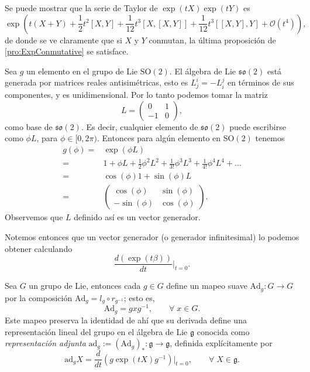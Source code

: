 Se puede mostrar que la serie de Taylor de $\exp (t X) \exp (t Y)$ es
%
\begin{equation*}
\exp \left( t (X + Y) + \frac{1}{2} t^{2} [X, Y] + \frac{1}{12} t^{3} [X, [X, Y]] + \frac{1}{12} t^{3} [[X, Y], Y] +\mathcal{O}(t^{4}) \right),
\end{equation*}
%
de donde se ve claramente que si $X$ y $Y$ conmutan, la \'{u}ltima proposici\'{o}n de \ref{pro:ExpConmutative} se satisface.

\begin{ex}
Sea $g$ un elemento en el grupo de Lie $\mathrm{SO}(2)$. El \'{a}lgebra de Lie $\mathfrak{so}(2)$ est\'{a} generada por matrices reales antisim\'{e}tricas, esto es $L^{i}_{j} = -L^{j}_{i}$ en t\'{e}rminos de sus componentes, y es unidimensional. Por lo tanto podemos tomar la matriz
%
\[L = 
 \begin{pmatrix}
  0 & 1 \\
  -1 & 0
 \end{pmatrix},
\]
%
como base de $\mathfrak{so}(2)$. Es decir, cualquier elemento de $\mathfrak{so}(2)$ puede escribirse como $\phi L$, para $\phi \in [0, 2 \pi)$. Entonces para alg\'{u}n elemento en $\mathrm{SO}(2)$  tenemos
%
\begin{align*}
g (\phi) = & \exp (\phi L) \\
= & 1 + \phi L + \frac{1}{2} \phi^{2} L^{2} + \frac{1}{3 !} \phi^{3} L^{3} + \frac{1}{4 !} \phi^{4} L^{4} + ... \\
= & \cos (\phi) 1 + \sin (\phi) L \\
= & \begin{pmatrix} \cos (\phi) & \sin (\phi) \\ -\sin (\phi) & \cos (\phi) \end{pmatrix}.
\end{align*}
%
Observemos que $L$ definido as\'{i} es un vector generador.
\end{ex}

\begin{obs}
Notemos entonces que un vector generador (o generador infinitesimal) lo podemos obtener calculando $$\frac{d (\exp (t \beta))}{dt} \bigg\vert_{t=0}.$$
\end{obs}

\begin{mydef}
Sea $G$ un grupo de Lie, entonces cada $g \in G$ define un mapeo suave $\mathrm{Ad}_{g}: G \rightarrow G$ por la composici\'{o}n $\mathrm{Ad}_{g} = l_{g} \circ r_{g^{-1}}$; esto es,
%
\begin{equation}
\mathrm{Ad}_{g} = g x g^{-1}, \qquad \forall \; x \in G.
\end{equation}
%
Este mapeo preserva la identidad de ah\'{i} que su derivada define una representaci\'{o}n lineal del grupo en el \'{a}lgebra de Lie $\mathfrak{g}$ conocida como \emph{representaci\'{o}n adjunta} $\mathrm{ad}_{g} := (\mathrm{Ad}_{g})_{*} : \mathfrak{g} \rightarrow \mathfrak{g}$, definida expl\'{i}citamente por
%
\begin{equation}
\mathrm{ad}_{g} X = \frac{d}{dt} \left(g \exp (t X) g^{-1} \right) \bigg\vert_{t=0}, \qquad \forall \; X \in \mathfrak{g}.
\end{equation}
%
\end{mydef}

